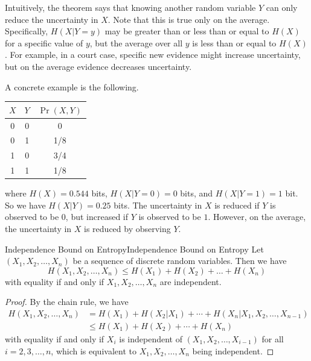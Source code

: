 \documentclass[../main.tex]{subfiles}
\begin{document}
\begin{remark}
  Intuitively, the theorem says that knowing another random variable $Y$ can only reduce the uncertainty in $X$. Note that this is true only on the average. Specifically, $H(X|Y=y)$ may be greater than or less than or equal to $H(X)$ for a specific value of $y$, but the average over all $y$ is less than or equal to $H(X)$. For example, in a court case, specific new evidence might increase uncertainty, but on the average evidence decreases uncertainty.

  \medskip
  A concrete example is the following.
  \begin{center}
    \begin{tabular}{c|c|c}
      $X$ & $Y$ & $\Pr(X, Y)$\\
      \hline
      0 & 0 & 0\\
      0 & 1 & 1/8\\
      1 & 0 & 3/4\\
      1 & 1 & 1/8
    \end{tabular}
  \end{center}
  where $H(X) = 0.544$ bits, $H(X|Y=0) = 0$ bits, and $H(X|Y=1) = 1$ bit. So we have $H(X|Y) = 0.25$ bits. The uncertainty in $X$ is reduced if $Y$ is observed to be $0$, but increased if $Y$ is observed to be $1$. However, on the average, the uncertainty in $X$ is reduced by observing $Y$.
\end{remark}

\begin{theorem}{Independence Bound on Entropy}{Independence Bound on Entropy}
  Let $(X_1, X_2, \ldots, X_n)$ be a sequence of discrete random variables. Then we have
  \begin{equation}
    H(X_1, X_2, \ldots, X_n) \leq H(X_1) + H(X_2) + \ldots + H(X_n)
  \end{equation}
  with equality if and only if $X_1, X_2, \ldots, X_n$ are independent.
\end{theorem}
\begin{proof}
  By the chain rule, we have
  \begin{equation*}
    \begin{aligned}
      H(X_1, X_2, \ldots, X_n) &= H(X_1) + H(X_2|X_1) + \cdots + H(X_n|X_1, X_2, \ldots, X_{n-1})\\
                               &\leq H(X_1) + H(X_2) + \cdots + H(X_n)
    \end{aligned}
  \end{equation*}
  with equality if and only if $X_i$ is independent of $(X_1, X_2, \ldots, X_{i-1})$ for all $i = 2, 3, \ldots, n$, which is equivalent to $X_1, X_2, \ldots, X_n$ being independent.
\end{proof}
\end{document}
